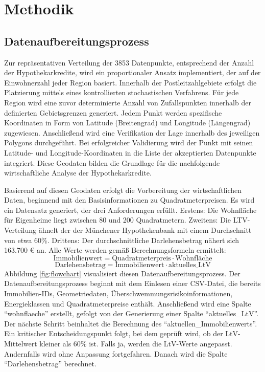 
\section{Methodik}
\subsection{Datenaufbereitungsprozess}
Zur repräsentativen Verteilung der 3853 Datenpunkte, entsprechend der Anzahl der Hypothekarkredite, wird ein proportionaler Ansatz implementiert, der auf der Einwohnerzahl jeder Region basiert. Innerhalb der Postleitzahlgebiete erfolgt die Platzierung mittels eines kontrollierten stochastischen Verfahrens. Für jede Region wird eine zuvor determinierte Anzahl von Zufallspunkten innerhalb der definierten Gebietsgrenzen generiert. Jedem Punkt werden spezifische Koordinaten in Form von Latitude (Breitengrad) und Longitude (Längengrad) zugewiesen. Anschließend wird eine Verifikation der Lage innerhalb des jeweiligen Polygons durchgeführt. Bei erfolgreicher Validierung wird der Punkt mit seinen Latitude- und Longitude-Koordinaten in die Liste der akzeptierten Datenpunkte integriert. Diese Geodaten bilden die Grundlage für die nachfolgende wirtschaftliche Analyse der Hypothekarkredite.

Basierend auf diesen Geodaten erfolgt die Vorbereitung der wirtschaftlichen Daten, beginnend mit den Basisinformationen zu Quadratmeterpreisen. Es wird ein Datensatz generiert, der drei Anforderungen erfüllt. Erstens: Die Wohnfläche für Eigenheime liegt zwischen 80 und 200 Quadratmetern. Zweitens: Die LTV-Verteilung ähnelt der der Münchener Hypothekenbank mit einem Durchschnitt von etwa 60\%. Drittens: Der durchschnittliche Darlehensbetrag nähert sich 163.700 € an. Alle Werte werden gemäß Berechnungsformeln ermittelt:
\begin{equation}
    \text{Immobilienwert} = \text{Quadratmeterpreis} \cdot \text{Wohnfläche}
\end{equation}
\begin{equation}
    \text{Darlehensbetrag} = \text{Immobilienwert} \cdot \text{aktuelles\_LtV}
\end{equation}
Abbildung \ref{fig:flowchart} visualisiert diesen Datenaufbereitungsprozess. Der Datenaufbereitungsprozess beginnt mit dem Einlesen einer CSV-Datei, die bereits Immobilien-IDs, Geometriedaten, Überschwemmungsrisikoinformationen, Energieklassen und Quadratmeterpreise enthält. Anschließend wird eine Spalte \enquote{wohnflaeche} erstellt, gefolgt von der Generierung einer Spalte \enquote{aktuelles\_LtV}. Der nächste Schritt beinhaltet die Berechnung des \enquote{aktuellen\_Immobilienwerts}. Ein kritischer Entscheidungspunkt folgt, bei dem geprüft wird, ob der LtV-Mittelwert kleiner als 60\% ist. Falls ja, werden die LtV-Werte angepasst. Andernfalls wird ohne Anpassung fortgefahren. Danach wird die Spalte \enquote{Darlehensbetrag} berechnet.

